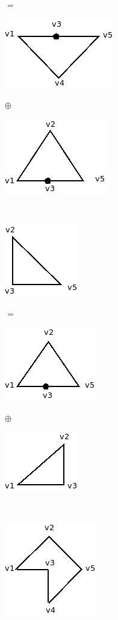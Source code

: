 \documentclass[10pt,a5paper]{book}
\begin{document}
\parbox{1cm}
{
$=$}
\parbox{3cm}
{
\includegraphics[scale=.6]{Fig2_8_5.png}
}
\hspace*{.1in}\parbox{1cm}
{
$\oplus$
}
\parbox{3cm}
{
\includegraphics[scale=.6]{Fig2_8_6.png}
}\hfill\\
\hspace*{-.5in}\parbox{3cm}
{
\includegraphics[scale=.6]{Fig2_8_7.png} 
}
\parbox{1cm}
{
$=$}
\parbox{3cm}
{
\includegraphics[scale=.6]{Fig2_8_8.png}
}
\hspace*{.1in}\parbox{1cm}
{
$\oplus$
}
\parbox{3cm}
{
\includegraphics[scale=.6]{Fig2_8_9.png}
}\hfill\\
\hspace*{-.9in}\parbox{2cm}
{
\includegraphics[scale=.6]{Fig2_8_10.png} 
}
\end{document}
